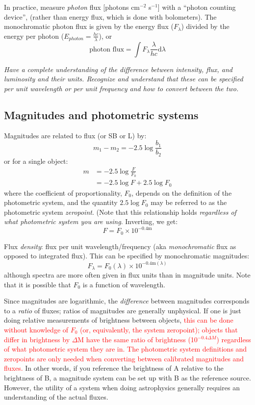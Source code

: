 \documentclass[12pt]{article}
\begin{document}
In practice, measure \emph{photon} flux [photons cm$^{-2}$ s$^{-1}$]
with a ``photon counting device'',
(rather than energy flux, which is done with bolometers).
The monochromatic photon flux is given by the
energy flux ($F_{\lambda}$) divided by the
energy per photon ($E_{photon} = \frac{hc}{\lambda}$), or
$$ \textrm{photon\ flux} = \int F_{\lambda}
    \frac{\lambda}{hc} \textrm{d} \lambda $$

\textcolor{om}{\emph{Have a complete understanding of the difference between
intensity, flux, and luminosity and their units. Recognize and
understand that these can be specified per unit wavelength or per unit
frequency and how to convert between the two.}}


\subsection*{Magnitudes and photometric systems}
Magnitudes are related to flux (or SB or L) by:
    $$  m_1 - m_2 = -2.5 \log \frac{b_1}{b_2} $$
or for a single object:
\begin{align*}
    m &= -2.5 \log \frac{F}{F_0}\\
      &= -2.5 \log F + 2.5 \log F_0
\end{align*}
where the coefficient of proportionality, $F_0$, depends on the definition
of the photometric system, and the quantity $2.5\log{F_0}$ may be referred to as
the photometric system \emph{zeropoint}.
(Note that this relationship holds
\emph{regardless of what photometric system you are using}.
Inverting, we get:
    $$ F = F_{0} \times 10^{-0.4\textrm{m}} $$

Flux \emph{density}: flux per unit wavelength/frequency
(aka \emph{monochromatic} flux as opposed to integrated flux).
This can be specified by monochromatic magnitudes:
\begin{equation*}
    F_{\lambda} = F_0 (\lambda) \times 10^{-0.4 \textrm{m}(\lambda)}
\end{equation*}
although spectra are more often given in flux units than in magnitude units.
Note that it is possible that $F_0$ is a function of wavelength.

Since magnitudes are logarithmic, the \emph{difference} between
magnitudes corresponds to a \emph{ratio} of fluxes; ratios of magnitudes are
generally unphysical. If one is just doing relative measurements of
brightness between objects,
\textcolor{red}{this can be done without knowledge of $F_0$
(or, equivalently, the system zeropoint); objects that differ in brightness
by $\Delta$M have the same ratio of brightness (10$^{-0.4 \Delta M}$)
regardless of what photometric system they are in.
The photometric system definitions and zeropoints are only needed when
converting between calibrated magnitudes and fluxes.}
In other words, if you reference the
brightness of A relative to the brightness of B, a magnitude system
can be set up with B as the reference source.
However, the utility of a system when doing astrophysics generally
requires an understanding of the actual fluxes.
\end{document}
